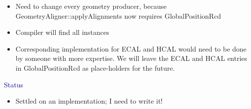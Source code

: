 \documentclass[compress]{beamer}
\begin{document}
\begin{frame}
\begin{itemize}\setlength{\itemsep}{0.25 cm}
\item Need to change every geometry producer, because GeometryAligner::applyAlignments now requires GlobalPositionRcd

\item Compiler will find all instances

\item Corresponding implementation for ECAL and HCAL would need to be
done by someone with more expertise.  We will leave the ECAL and HCAL
entries in GlobalPositionRcd as place-holders for the future.
\end{itemize}

\vfill
\hspace{-0.83 cm} \textcolor{darkblue}{\Large Status}
\begin{itemize}
\item Settled on an implementation; I need to write it!
\end{itemize}

\label{numpages}
\end{frame}
\end{document}
